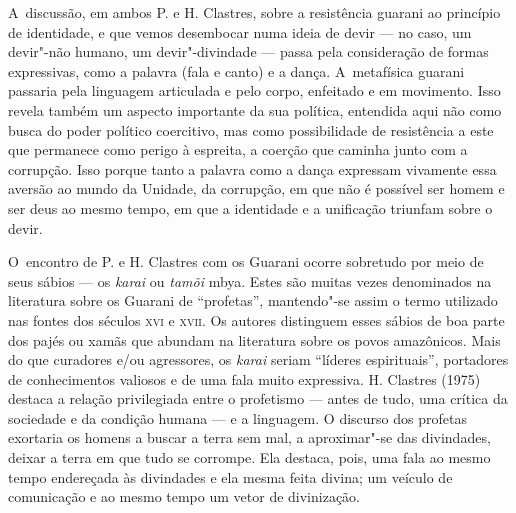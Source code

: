 A~discussão, em ambos P. e H. Clastres, sobre a resistência guarani ao
princípio de identidade, e que vemos desembocar numa ideia de devir ---
no caso, um devir"-não humano, um devir"-divindade --- passa pela
consideração de formas expressivas, como a palavra (fala e canto) e a
dança. A~metafísica guarani passaria pela linguagem articulada e pelo
corpo, enfeitado e em movimento. Isso revela também um aspecto
importante da sua política, entendida aqui não como busca do poder
político coercitivo, mas como possibilidade de resistência a este que
permanece como perigo à espreita, a coerção que caminha junto com a
corrupção. Isso porque tanto a palavra como a dança expressam vivamente
essa aversão ao mundo da Unidade, da corrupção, em que não é possível
ser homem e ser deus ao mesmo tempo, em que a identidade e a unificação
triunfam sobre o devir. 

O~encontro de P. e H. Clastres com os Guarani ocorre sobretudo por meio
de seus sábios --- os \emph{karai} ou \emph{tamõi} mbya. Estes são muitas vezes
denominados na literatura sobre os Guarani de ``profetas'', mantendo"-se
assim o termo utilizado nas fontes dos séculos \textsc{xvi} e \textsc{xvii}. Os autores
distinguem esses sábios de boa parte dos pajés ou xamãs que abundam na
literatura sobre os povos amazônicos. Mais do que curadores e/ou
agressores, os \emph{karai} seriam ``líderes espirituais'', portadores de
conhecimentos valiosos e de uma fala muito expressiva. H. Clastres
(1975) destaca a relação privilegiada entre o profetismo --- antes de
tudo, uma crítica da sociedade e da condição humana --- e a linguagem. O
discurso dos profetas exortaria os homens a buscar a terra sem mal, a
aproximar"-se das divindades, deixar a terra em que tudo se corrompe.
Ela destaca, pois, uma fala ao mesmo tempo endereçada às divindades e
ela mesma feita divina; um veículo de comunicação e ao mesmo tempo um
vetor de divinização.

